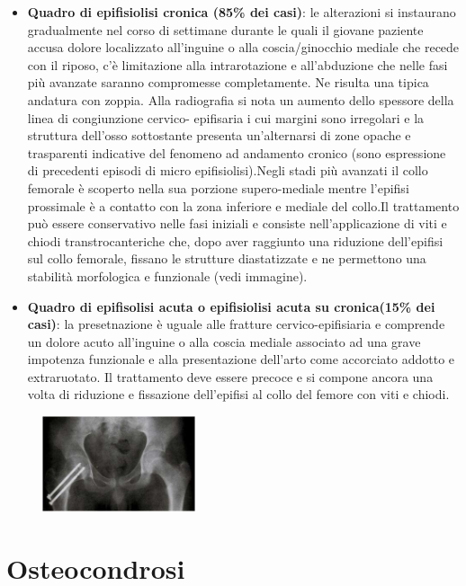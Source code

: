 \begin{itemize}
\item
  \textbf{Quadro di epifisiolisi cronica (85\% dei casi)}: le alterazioni si instaurano gradualmente nel corso di settimane durante le quali il giovane paziente accusa dolore localizzato all'inguine o alla coscia/ginocchio mediale che recede con il riposo, c'è limitazione alla intrarotazione e all'abduzione che nelle fasi più avanzate saranno compromesse completamente. Ne risulta una tipica andatura con zoppia. Alla radiografia si nota un aumento dello spessore della linea di congiunzione cervico- epifisaria i cui margini sono irregolari e la struttura dell'osso sottostante presenta un'alternarsi di zone opache e trasparenti indicative del fenomeno ad andamento cronico (sono espressione di precedenti episodi di micro epifisiolisi).Negli stadi più avanzati il collo femorale è scoperto nella sua porzione supero-mediale mentre l'epifisi prossimale è a contatto con la zona inferiore e mediale del collo.Il trattamento può essere conservativo nelle fasi iniziali e consiste nell'applicazione di viti e chiodi transtrocanteriche che, dopo aver raggiunto una riduzione dell'epifisi sul collo femorale, fissano le strutture diastatizzate e ne permettono una stabilità morfologica e funzionale (vedi immagine).
\item
  \textbf{Quadro di epifisolisi acuta o epifisiolisi acuta su cronica(15\% dei casi)}: la presetnazione è uguale alle fratture cervico-epifisiaria e comprende un dolore acuto all'inguine o alla coscia mediale associato ad una grave impotenza funzionale e alla presentazione dell'arto come accorciato addotto e extraruotato. Il trattamento deve essere precoce e si compone ancora una volta di riduzione e fissazione dell'epifisi al collo del femore con viti e chiodi.
\end{itemize}

\begin{figure}[!ht]
\centering
\includegraphics[width=0.4\textwidth]{020/image1.jpeg}
\end{figure}

\section{Osteocondrosi}


